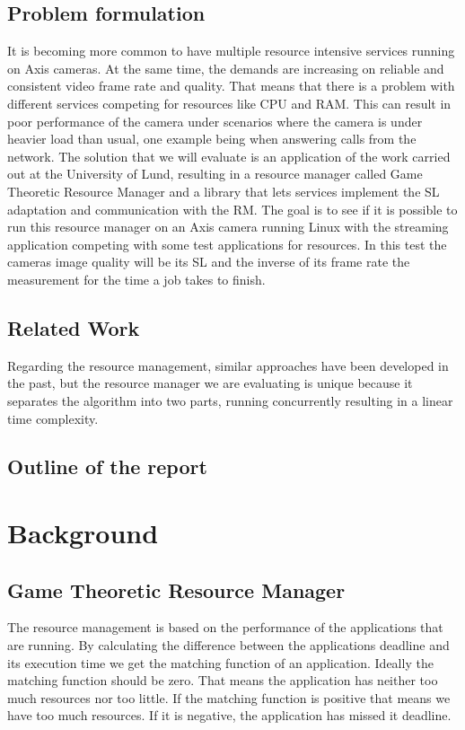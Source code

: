 \documentclass{LTHthesis}
\begin{document}
\section{Problem formulation}
It is becoming more common to have multiple resource intensive services running on Axis cameras. At the same time, the demands are increasing on reliable and consistent video frame rate and quality. That means that there is a problem with different services competing for resources like CPU and RAM. This can result in poor performance of the camera under scenarios where the camera is under heavier load than usual, one example being when answering calls from the network. The solution that we will evaluate is an application of the work carried out at the University of Lund, resulting in a resource manager called Game Theoretic Resource Manager and a library that lets services implement the SL adaptation and communication with the RM. The goal is to see if it is possible to run this resource manager on an Axis camera running Linux with the streaming application competing with some test applications for resources. In this test the cameras image quality will be its SL and the inverse of its frame rate the measurement for the time a job takes to finish.



\section{Related Work}
Regarding the resource management, similar approaches have been developed in the past, but the resource manager we are evaluating is unique because it separates the algorithm into two parts, running concurrently resulting in a linear time complexity.

\section{Outline of the report}

\chapter{Background}

\section{Game Theoretic Resource Manager}
The resource management is based on the performance of the applications that are running. By calculating the difference between the applications deadline and its execution time we get the matching function of an application. Ideally the matching function should be zero. That means the application has neither too much resources nor too little. If the matching function is positive that means we have too much resources. If it is negative, the application has missed it deadline.
\end{document}
